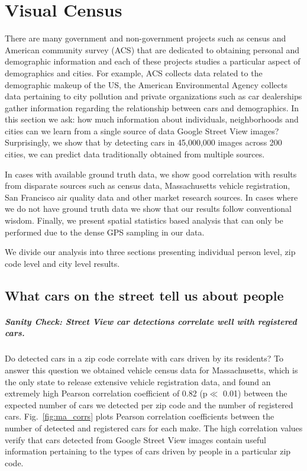 \documentclass[10pt,twocolumn,letterpaper]{article}
\begin{document}
 \section{Visual Census}
\label{sec:social}
There are many government and non-government projects such as census and American community survey (ACS) that are dedicated to obtaining personal and demographic information and  each of these projects studies a particular aspect of demographics and cities. For example, ACS collects data related to the demographic makeup of the US, the American Environmental Agency collects data pertaining to city pollution and private organizations such as car dealerships gather information regarding the relationship between cars and demographics. In this section we ask: how much information about individuals, neighborhoods and cities can we learn from  a single source of data \textemdash Google Street View images? Surprisingly, we show that by detecting cars in 45,000,000 images across 200 cities, we can predict data traditionally obtained from multiple sources. 

In cases with available ground truth data, we show good correlation with results from disparate sources such as census data, Massachusetts vehicle registration,  San Francisco air quality data and other market research sources. In cases where we do not have ground truth data we show that our results follow conventional wisdom. Finally, we present spatial statistics based analysis that can only be performed due to the dense GPS sampling in our data. 

We divide our analysis into three sections presenting individual person level, zip code level and city level results.

\subsection{What cars on the street tell us about people}
\subparagraph{Sanity Check: Street View car detections correlate well with registered cars.}
Do detected cars in a zip code correlate with cars driven by its residents?  To answer this question we obtained vehicle census data for Massachusetts, which is the only state to release extensive vehicle registration data, and found an extremely high Pearson correlation coefficient of 0.82 (p\(\ll\) 0.01) between the expected number of cars we detected per zip code and the number of registered cars. Fig.~\ref{fig:ma_corrs} plots Pearson correlation coefficients between the number of detected and registered cars for each make. The high correlation values verify that cars detected from Google Street View images contain useful information pertaining to the types of cars driven by people in a particular zip code.
\end{document}
